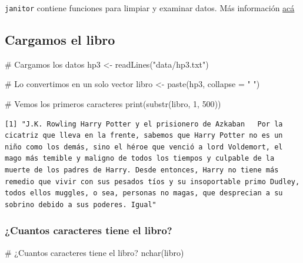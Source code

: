 \documentclass[
  letterpaper,
  DIV=11,
  numbers=noendperiod]{scrreprt}
\newenvironment{Shaded}{\begin{snugshade}}{\end{snugshade}}
\newcommand{\AttributeTok}[1]{\textcolor[rgb]{0.40,0.45,0.13}{#1}}
\newcommand{\CommentTok}[1]{\textcolor[rgb]{0.37,0.37,0.37}{#1}}
\newcommand{\DecValTok}[1]{\textcolor[rgb]{0.68,0.00,0.00}{#1}}
\newcommand{\FunctionTok}[1]{\textcolor[rgb]{0.28,0.35,0.67}{#1}}
\newcommand{\NormalTok}[1]{\textcolor[rgb]{0.00,0.23,0.31}{#1}}
\newcommand{\OtherTok}[1]{\textcolor[rgb]{0.00,0.23,0.31}{#1}}
\newcommand{\StringTok}[1]{\textcolor[rgb]{0.13,0.47,0.30}{#1}}
\begin{document}
\texttt{janitor} contiene funciones para limpiar y examinar datos. Más
información
\href{https://www.rdocumentation.org/packages/janitor/versions/2.2.1}{acá}

\subsection{Cargamos el libro}\label{cargamos-el-libro}

\begin{Shaded}
\begin{Highlighting}[]
\CommentTok{\# Cargamos los datos}
\NormalTok{hp3 }\OtherTok{\textless{}{-}} \FunctionTok{readLines}\NormalTok{(}\StringTok{"data/hp3.txt"}\NormalTok{)}

\CommentTok{\# Lo convertimos en un solo vector}
\NormalTok{libro }\OtherTok{\textless{}{-}} \FunctionTok{paste}\NormalTok{(hp3, }\AttributeTok{collapse =} \StringTok{" "}\NormalTok{)}

\CommentTok{\# Vemos los primeros caracteres}
\FunctionTok{print}\NormalTok{(}\FunctionTok{substr}\NormalTok{(libro, }\DecValTok{1}\NormalTok{, }\DecValTok{500}\NormalTok{))  }
\end{Highlighting}
\end{Shaded}

\begin{verbatim}
[1] "J.K. Rowling Harry Potter y el prisionero de Azkaban   Por la cicatriz que lleva en la frente, sabemos que Harry Potter no es un niño como los demás, sino el héroe que venció a lord Voldemort, el mago más temible y maligno de todos los tiempos y culpable de la muerte de los padres de Harry. Desde entonces, Harry no tiene más remedio que vivir con sus pesados tíos y su insoportable primo Dudley, todos ellos muggles, o sea, personas no magas, que desprecian a su sobrino debido a sus poderes. Igual"
\end{verbatim}

\subsubsection{¿Cuantos caracteres tiene el
libro?}\label{cuantos-caracteres-tiene-el-libro}

\begin{Shaded}
\begin{Highlighting}[]
\CommentTok{\# ¿Cuantos caracteres tiene el libro? }
\FunctionTok{nchar}\NormalTok{(libro)}
\end{Highlighting}
\end{Shaded}
\end{document}
